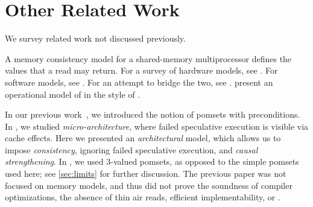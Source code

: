 \section{Other Related Work}\label{sec:related}
We survey related work not discussed previously.

A memory consistency model for a shared-memory multiprocessor defines the
values that a read may return.  For a survey of hardware models, see
\citep{AlglaveThesis}. For software models, see
\citep{DBLP:journals/toplas/Lochbihler13,DBLP:phd/ethos/Batty15}.  For an
attempt to bridge the two, see \citep{DBLP:journals/pacmpl/PodkopaevLV19}.
\citet{DBLP:conf/pldi/PultePKLH19} present an operational model of
\armeight{} in the style of \cite{DBLP:conf/popl/KangHLVD17}.

In our previous work~\cite{2019-sp}, we introduced the notion of pomsets with
preconditions.  In \citeyear{2019-sp}, we studied \emph{micro\hyp{}architecture},
where failed speculative execution is visible via cache effects.  Here we
presented an \emph{architectural} model, which allows us to impose
\emph{consistency}, ignoring failed speculative execution, and \emph{causal
  strengthening}.  In \citeyear{2019-sp}, we used 3-valued pomsets, as
opposed to the simple pomsets used here; see \textsection\ref{sec:limits} for
further discussion.  The previous paper was not focused on memory models, and
thus did not prove the soundness of compiler optimizations, the absence of
thin air reads, efficient implementability, or \drfsc{}.


